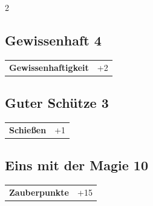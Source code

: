 \begin{multicols}{2}
\begin{tcolorbox}

\end{tcolorbox}

\begin{tcolorbox}
    \subsection*{Gewissenhaft \hfill \small{4 }}
    \tcblower




\begin{tabular}{@{}ll@{}}
    \textbf{Gewissenhaftigkeit} & +2\\
\end{tabular}


\end{tcolorbox}

\begin{tcolorbox}
    \subsection*{Guter Schütze \hfill \small{3 }}
    \tcblower




\begin{tabular}{@{}ll@{}}
    \textbf{Schießen} & +1\\
\end{tabular}


\end{tcolorbox}

\begin{tcolorbox}
    \subsection*{Eins mit der Magie \hfill \small{10 }}
    \tcblower




\begin{tabular}{@{}ll@{}}
    \textbf{Zauberpunkte} & +15\\
\end{tabular}


\end{tcolorbox}
\end{multicols}
